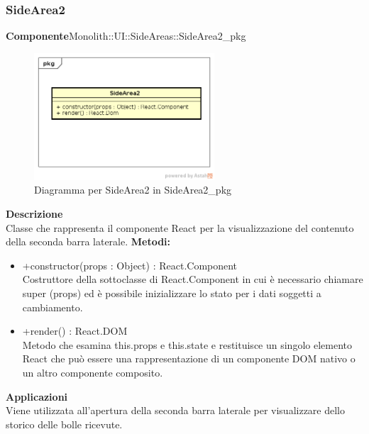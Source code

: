 \subsubsection{SideArea2}
\textbf{Componente}Monolith::UI::SideAreas::SideArea2\_pkg\\
   \FloatBarrier
   \begin{figure}[ht]
   \centering
   \includegraphics[width=0.6\textwidth]{img/single-SideArea2}
   \caption{{Diagramma per SideArea2 in SideArea2\_pkg}}
\end{figure}
\FloatBarrier
\textbf{Descrizione}\\
Classe che rappresenta il componente React per la visualizzazione del contenuto della seconda barra laterale.
\textbf{Metodi:} \begin{itemize}\item +constructor(props : Object) : React.Component \\Costruttore della sottoclasse di React.Component in cui è necessario chiamare super (props) ed è possibile inizializzare lo stato per i dati soggetti a cambiamento.\item +render() : React.DOM \\Metodo che esamina this.props e this.state e restituisce un singolo elemento React che può essere una rappresentazione di un componente DOM nativo o un altro componente composito.

\end{itemize} 


\textbf{Applicazioni}\\
Viene utilizzata all'apertura della seconda barra laterale per visualizzare dello storico delle bolle ricevute. 


\clearpage

